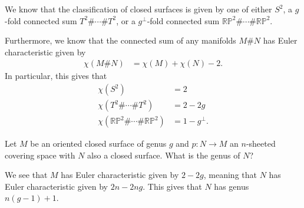 \documentclass[10pt]{mypackage}
\begin{document}
\begin{solution}
  We know that the classification of closed surfaces is given by one of either $S^2$, a $g$-fold connected sum $T^2\#\cdots\# T^2$, or a $g^{\perp}$-fold connected sum $ \mathbb{RP}^2\#\cdots\# \mathbb{RP}^2$.

  Furthermore, we know that the connected sum of any manifolds $M\# N$ has Euler characteristic given by
  \begin{align*}
    \chi\left( M\# N \right) &= \chi\left( M \right) + \chi\left( N \right) - 2.
  \end{align*}
  In particular, this gives that
  \begin{align*}
    \chi\left( S^2 \right) &= 2\\
    \chi\left( T^2\#\cdots\# T^2 \right) &= 2-2g\\
    \chi\left( \mathbb{RP}^2\#\cdots\# \mathbb{RP}^2 \right) &= 1-g^{\perp}.
  \end{align*}
\end{solution}
\begin{problem}[Problem 4]
  Let $M$ be an oriented closed surface of genus $g$ and $p\colon N\rightarrow M$ an $n$-sheeted covering space with $N$ also a closed surface. What is the genus of $N$?
\end{problem}
\begin{solution}
  We see that $M$ has Euler characteristic given by $2-2g$, meaning that $N$ has Euler characteristic given by $2n-2ng$. This gives that $N$ has genus $n\left( g-1 \right) + 1$.
\end{solution}
\end{document}

